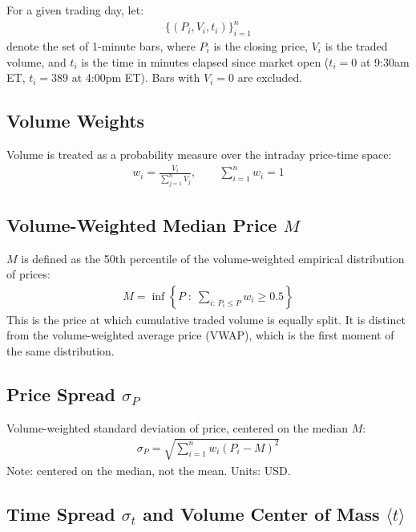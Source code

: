 \documentclass[11pt]{article}
\begin{document}
For a given trading day, let:
\begin{align}
    \{(P_i, V_i, t_i)\}_{i=1}^{n}
\end{align}
denote the set of 1-minute bars, where $P_i$ is the closing price, $V_i$ is the traded volume, and $t_i$ is the time in minutes elapsed since market open ($t_i = 0$ at 9:30am ET, $t_i = 389$ at 4:00pm ET). Bars with $V_i = 0$ are excluded.

\subsection{Volume Weights}

Volume is treated as a probability measure over the intraday price-time space:
\begin{align}
    w_i = \frac{V_i}{\sum_{j=1}^{n} V_j}, \qquad \sum_{i=1}^{n} w_i = 1
\end{align}

\subsection{Volume-Weighted Median Price \texorpdfstring{$M$}{M}}

$M$ is defined as the 50th percentile of the volume-weighted empirical distribution of prices:
\begin{align}
    M = \inf\left\{ P \;:\; \sum_{i:\, P_i \leq P} w_i \geq 0.5 \right\}
\end{align}
This is the price at which cumulative traded volume is equally split. It is distinct from the volume-weighted average price (VWAP), which is the first moment of the same distribution.

\subsection{Price Spread \texorpdfstring{$\sigma_P$}{sigma\_P}}

Volume-weighted standard deviation of price, centered on the median $M$:
\begin{align}
    \sigma_P = \sqrt{\sum_{i=1}^{n} w_i (P_i - M)^2}
\end{align}
Note: centered on the median, not the mean. Units: USD.

\subsection{Time Spread \texorpdfstring{$\sigma_t$}{sigma\_t} and Volume Center of Mass \texorpdfstring{$\langle t \rangle$}{<t>}}
\end{document}
